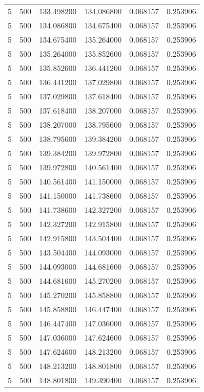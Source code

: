 \begin{longtable}{rrrrrr}
5 & 500 & 133.498200 & 134.086800 & 0.068157 & 0.253906 \\
5 & 500 & 134.086800 & 134.675400 & 0.068157 & 0.253906 \\
5 & 500 & 134.675400 & 135.264000 & 0.068157 & 0.253906 \\
5 & 500 & 135.264000 & 135.852600 & 0.068157 & 0.253906 \\
5 & 500 & 135.852600 & 136.441200 & 0.068157 & 0.253906 \\
5 & 500 & 136.441200 & 137.029800 & 0.068157 & 0.253906 \\
5 & 500 & 137.029800 & 137.618400 & 0.068157 & 0.253906 \\
5 & 500 & 137.618400 & 138.207000 & 0.068157 & 0.253906 \\
5 & 500 & 138.207000 & 138.795600 & 0.068157 & 0.253906 \\
5 & 500 & 138.795600 & 139.384200 & 0.068157 & 0.253906 \\
5 & 500 & 139.384200 & 139.972800 & 0.068157 & 0.253906 \\
5 & 500 & 139.972800 & 140.561400 & 0.068157 & 0.253906 \\
5 & 500 & 140.561400 & 141.150000 & 0.068157 & 0.253906 \\
5 & 500 & 141.150000 & 141.738600 & 0.068157 & 0.253906 \\
5 & 500 & 141.738600 & 142.327200 & 0.068157 & 0.253906 \\
5 & 500 & 142.327200 & 142.915800 & 0.068157 & 0.253906 \\
5 & 500 & 142.915800 & 143.504400 & 0.068157 & 0.253906 \\
5 & 500 & 143.504400 & 144.093000 & 0.068157 & 0.253906 \\
5 & 500 & 144.093000 & 144.681600 & 0.068157 & 0.253906 \\
5 & 500 & 144.681600 & 145.270200 & 0.068157 & 0.253906 \\
5 & 500 & 145.270200 & 145.858800 & 0.068157 & 0.253906 \\
5 & 500 & 145.858800 & 146.447400 & 0.068157 & 0.253906 \\
5 & 500 & 146.447400 & 147.036000 & 0.068157 & 0.253906 \\
5 & 500 & 147.036000 & 147.624600 & 0.068157 & 0.253906 \\
5 & 500 & 147.624600 & 148.213200 & 0.068157 & 0.253906 \\
5 & 500 & 148.213200 & 148.801800 & 0.068157 & 0.253906 \\
5 & 500 & 148.801800 & 149.390400 & 0.068157 & 0.253906 \\

\end{longtable}
